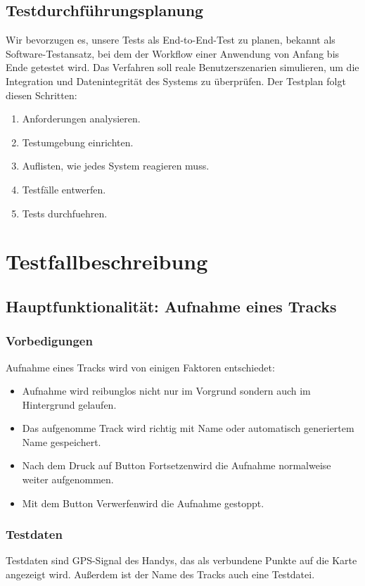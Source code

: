 \documentclass{article}
\begin{document}
\subsection{Testdurchführungsplanung}
	Wir bevorzugen es, unsere Tests als End-to-End-Test zu planen, bekannt als Software-Testansatz, bei dem der Workflow einer Anwendung von Anfang bis Ende getestet wird. Das Verfahren soll reale Benutzerszenarien simulieren, um die Integration und Datenintegrität des Systems zu überprüfen. Der Testplan folgt diesen Schritten: \par
	\begin{enumerate}
		\item Anforderungen analysieren.
		\item Testumgebung einrichten.
		\item Auflisten, wie jedes System reagieren muss.
		\item Testfälle entwerfen.
		\item Tests durchfuehren.
	\end{enumerate}

\section{Testfallbeschreibung}
\subsection{Hauptfunktionalität: Aufnahme eines Tracks}
\subsubsection{Vorbedigungen}
	Aufnahme eines Tracks wird von einigen Faktoren entschiedet:
	\begin{itemize}
		\item Aufnahme wird reibunglos nicht nur im Vorgrund sondern auch im Hintergrund gelaufen.
		\item Das aufgenomme Track wird richtig mit Name oder automatisch generiertem Name gespeichert.
		\item Nach dem Druck auf Button \glqq Fortsetzen\grqq wird die Aufnahme normalweise weiter aufgenommen.
		\item Mit dem Button \glqq Verwerfen\grqq wird die Aufnahme gestoppt.
	\end{itemize}
\subsubsection{Testdaten}
	Testdaten sind GPS-Signal des Handys, das als verbundene Punkte auf die Karte angezeigt wird. Außerdem ist der Name des Tracks auch eine Testdatei.
\end{document}
